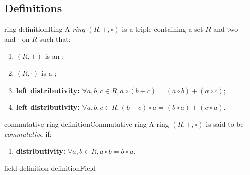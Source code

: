\documentclass[preview]{standalone}
\begin{document}
\genpage

\subsection{Definitions}

\begin{snippetdefinition}{ring-definition}{Ring}
    A \textit{ring} \((R, +, \circ)\) is a triple containing a set \(R\) and two 
    \(+\) and \(\cdot\) on \(R\) such that:
    \begin{enumerate}
        \item \((R, +)\) is an \abeliangroup;
        \item \((R, \cdot)\) is a \monoid;
        \item \textbf{left distributivity:} \(\forall a,b,c\in R, a\circ(b+c) = (a\circ b) + (a \circ c)\);
        \item \textbf{left distributivity:} \(\forall a,b,c\in R, (b+c)\circ a = (b\circ a) + (c \circ a)\).
    \end{enumerate}
\end{snippetdefinition}

\begin{snippetdefinition}{commutative-ring-definition}{Commutative ring}
    A ring \((R, +, \circ)\) is said to be \textit{commutative} if:
    \begin{enumerate}
        \item \textbf{distributivity:} \(\forall a,b\in R, a\circ b = b\circ a\).
    \end{enumerate}
\end{snippetdefinition}

\begin{snippetdefinition}{field-definition-definition}{Field}
    \todo
\end{snippetdefinition}
\end{document}
